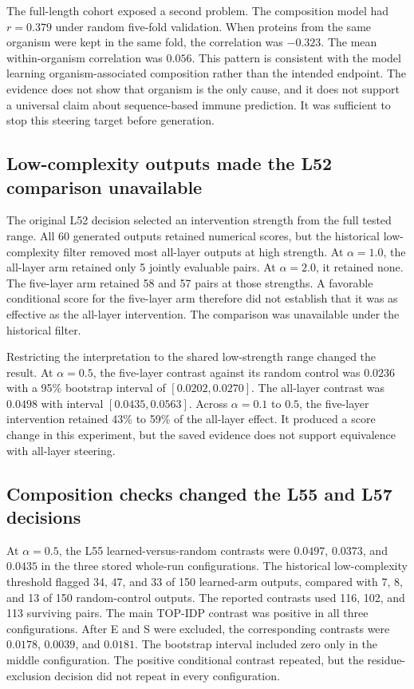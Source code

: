 \documentclass{article}
\begin{document}
The full-length cohort exposed a second problem. The composition model had
$r=0.379$ under random five-fold validation. When proteins from the same
organism were kept in the same fold, the correlation was $-0.323$. The mean
within-organism correlation was $0.056$. This pattern is consistent with the
model learning organism-associated composition rather than the intended
endpoint. The evidence does not show that organism is the only cause, and it
does not support a universal claim about sequence-based immune prediction.
It was sufficient to stop this steering target before generation.

\subsection{Low-complexity outputs made the L52 comparison unavailable}

The original L52 decision selected an intervention strength from the full
tested range. All 60 generated outputs retained numerical scores, but the
historical low-complexity filter removed most all-layer outputs at high
strength. At $\alpha=1.0$, the all-layer arm retained only 5 jointly evaluable
pairs. At $\alpha=2.0$, it retained none. The five-layer arm retained 58 and 57
pairs at those strengths. A favorable conditional score for the five-layer arm
therefore did not establish that it was as effective as the all-layer
intervention. The comparison was unavailable under the historical filter.

Restricting the interpretation to the shared low-strength range changed the
result. At $\alpha=0.5$, the five-layer contrast against its random control was
$0.0236$ with a 95\% bootstrap interval of $[0.0202, 0.0270]$. The all-layer
contrast was $0.0498$ with interval $[0.0435, 0.0563]$. Across
$\alpha=0.1$ to $0.5$, the five-layer intervention retained 43\% to 59\% of
the all-layer effect. It produced a score change in this experiment, but the
saved evidence does not support equivalence with all-layer steering.

\subsection{Composition checks changed the L55 and L57 decisions}

At $\alpha=0.5$, the L55 learned-versus-random contrasts were $0.0497$,
$0.0373$, and $0.0435$ in the three stored whole-run configurations. The
historical low-complexity threshold flagged 34, 47, and 33 of 150 learned-arm
outputs, compared with 7, 8, and 13 of 150 random-control outputs. The reported
contrasts used 116, 102, and 113 surviving pairs. The main TOP-IDP contrast was
positive in all three configurations. After E and S were excluded, the
corresponding contrasts were $0.0178$, $0.0039$, and $0.0181$. The bootstrap
interval included zero only in the middle configuration. The positive
conditional contrast repeated, but the residue-exclusion decision did not
repeat in every configuration.
\end{document}
